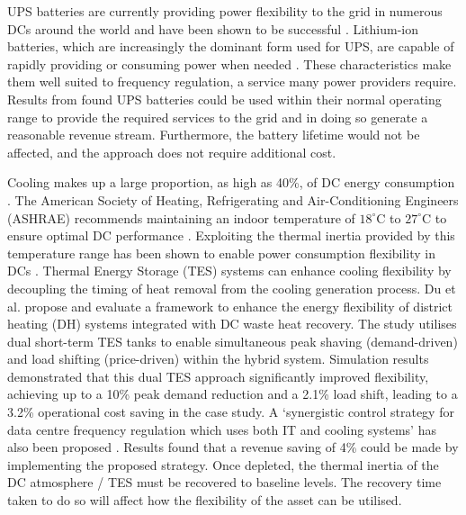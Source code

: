 \documentclass[lettersize,journal]{IEEEtran}
\begin{document}
UPS batteries are currently providing power flexibility to the grid in numerous DCs around the world and have been shown to be successful \cite{alapera2019fast,roach2022microsoft,Anghel_2023}. Lithium-ion batteries, which are increasingly the dominant form used for UPS, are capable of rapidly providing or consuming power when needed \cite{alapera2018data}. These characteristics make them well suited to frequency regulation, a service many power providers require. Results from \cite{alapera2018data} found UPS batteries could be used within their normal operating range to provide the required services to the grid and in doing so generate a reasonable revenue stream. Furthermore, the battery lifetime would not be affected, and the approach does not require additional cost.

Cooling makes up a large proportion, as high as 40\%, of DC energy consumption \cite{zhao2021synthetic}.  The American Society of Heating, Refrigerating and Air-Conditioning Engineers (ASHRAE) recommends maintaining an indoor temperature of $18^\circ\mathrm{C}$ to $27^\circ\mathrm{C}$ to ensure optimal DC performance \cite{tc2016data}. Exploiting the thermal inertia provided by this temperature range has been shown to enable power consumption flexibility in DCs \cite{takci2025data}\cite{ref22}. Thermal Energy Storage (TES) systems can enhance cooling flexibility by decoupling the timing of heat removal from the cooling generation process.
Du et al. \cite{du2025new} propose and evaluate a framework to enhance the energy flexibility of district heating (DH) systems integrated with DC waste heat recovery. The study utilises dual short-term TES tanks to enable simultaneous peak shaving (demand-driven) and load shifting (price-driven) within the hybrid system. Simulation results demonstrated that this dual TES approach significantly improved flexibility, achieving up to a 10\% peak demand reduction and a 2.1\% load shift, leading to a 3.2\% operational cost saving in the case study. A `synergistic control strategy for data centre frequency regulation which uses both IT and cooling systems' has also been proposed \cite{Fu2020ApEn}. Results found that a revenue saving of 4\% could be made by implementing the proposed strategy. Once depleted, the thermal inertia of the DC atmosphere / TES must be recovered to baseline levels. The recovery time taken to do so will affect how the flexibility of the asset can be utilised.
\end{document}
